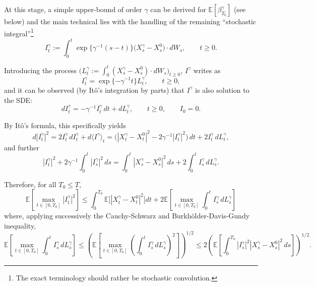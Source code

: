 \documentclass[11pt]{article}
\theoremstyle{remark}
\begin{document}
At this stage, a simple upper-bound of order $\gamma$ can be derived for $\mathbb{E}[\beta_{T_0}^{\gamma}]$ (see below) and the main technical lies with the handling of the remaining ``stochastic integral''\footnote{The exact terminology should rather be stochastic convolution.}
\[
I_t^{\gamma}:=\int_0^t \exp\{\gamma^{-1}(s-t)\}\bigl(X_s^{\gamma}-X_s^0\bigr)\cdot dW_s,\qquad t\ge 0.
\]


Introducing the process $\bigl(L_t^{\gamma}:=\int_0^t (X_s^{\gamma}-X_s^0)\cdot dW_s\bigr)_{t\ge0}$, $I^{\gamma}$ writes as
\[
I_t^{\gamma}=\exp\{-\gamma^{-1}t\}L_t^{\gamma},\qquad t\ge0,
\]
and it can be observed (by It\^o's integration by parts) that $I^{\gamma}$ is also solution to the SDE:
\[
dI_t^{\gamma}=-\gamma^{-1}I_t^{\gamma}\,dt+dL_t^{\gamma},\qquad t\ge0,\qquad I_0=0.
\]

By It\^o's formula, this specifically yields
\[
d|I_t^{\gamma}|^2=2I_t^{\gamma}\,dI_t^{\gamma}+d\langle I^{\gamma}\rangle_t
=\bigl(|X_t^{\gamma}-X_t^0|^2-2\gamma^{-1}|I_t^{\gamma}|^2\bigr)\,dt+2I_t^{\gamma}\,dL_t^{\gamma},
\]
and further
\[
|I_t^{\gamma}|^2+2\gamma^{-1}\int_0^t |I_s^{\gamma}|^2\,ds
=\int_0^t |X_s^{\gamma}-X_s^0|^2\,ds+2\int_0^t I_s^{\gamma}\,dL_s^{\gamma}.
\]

Therefore, for all $T_0\le T$,
\[
\mathbb{E}\left[\max_{t\in[0,T_0]}|I_t^{\gamma}|^2\right]
\le \int_0^{T_0}\mathbb{E}\bigl[|X_t^{\gamma}-X_t^0|^2\bigr]dt
+2\mathbb{E}\left[\max_{t\in[0,T_0]}\int_0^t I_s^{\gamma}\,dL_s^{\gamma}\right]
\]
where, applying successively the Cauchy-Schwarz and Burkh\"older-Davis-Gundy inequality,
\begin{equation}
\label{eq:3.13}
\mathbb{E}\left[\max_{t\in[0,T_0]}\int_0^t I_s^{\gamma}\,dL_s^{\gamma}\right]
\le \left(\mathbb{E}\left[\max_{t\in[0,T_0]}\left(\int_0^t I_s^{\gamma}\,dL_s^{\gamma}\right)^2\right]\right)^{1/2}
\le 2\left(\mathbb{E}\left[\int_0^{T_0}|I_s^{\gamma}|^2|X_s^{\gamma}-X_s^0|^2\,ds\right]\right)^{1/2}.
\end{equation}
\end{document}
